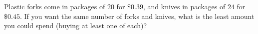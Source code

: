 Plastic forks come in packages of $20$ for $\$0.39$, and knives in packages of $24$ for $\$0.45$. If you want the same number of forks and knives, what is the least amount you could spend (buying at least one of each)?
